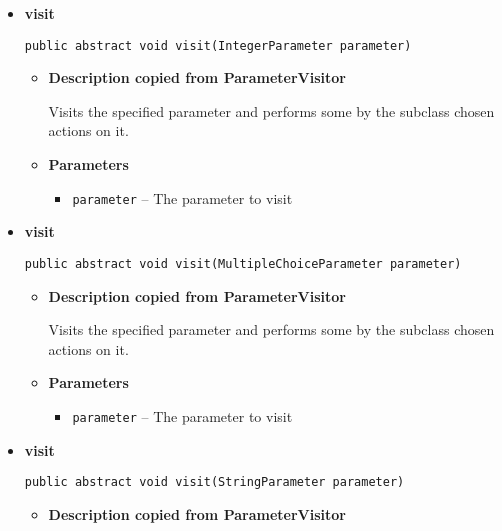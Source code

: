{{{{{{{{{{\begin{itemize}
{\begin{itemize}
{Visits the specified parameter and performs some by the subclass chosen actions on it.
}
\item{
{\bf  Parameters}
  \begin{itemize}
   \item{
\texttt{parameter} -- The parameter to visit}
  \end{itemize}
}%
\end{itemize}
}%
\item{ 
{\bf  visit}\\
\begin{lstlisting}[frame=none]
public abstract void visit(IntegerParameter parameter)\end{lstlisting} %
\begin{itemize}
\item{
{\bf  Description copied from ParameterVisitor{\small {}} }

Visits the specified parameter and performs some by the subclass chosen actions on it.
}
\item{
{\bf  Parameters}
  \begin{itemize}
   \item{
\texttt{parameter} -- The parameter to visit}
  \end{itemize}
}%
\end{itemize}
}%
\item{ 
{\bf  visit}\\
\begin{lstlisting}[frame=none]
public abstract void visit(MultipleChoiceParameter parameter)\end{lstlisting} %
\begin{itemize}
\item{
{\bf  Description copied from ParameterVisitor{\small {}} }

Visits the specified parameter and performs some by the subclass chosen actions on it.
}
\item{
{\bf  Parameters}
  \begin{itemize}
   \item{
\texttt{parameter} -- The parameter to visit}
  \end{itemize}
}%
\end{itemize}
}%
\item{ 
{\bf  visit}\\
\begin{lstlisting}[frame=none]
public abstract void visit(StringParameter parameter)\end{lstlisting} %
\begin{itemize}
\item{
{\bf  Description copied from ParameterVisitor{\small {}} }

}
\end{itemize}}
\end{itemize}}}}}}}}}}}
